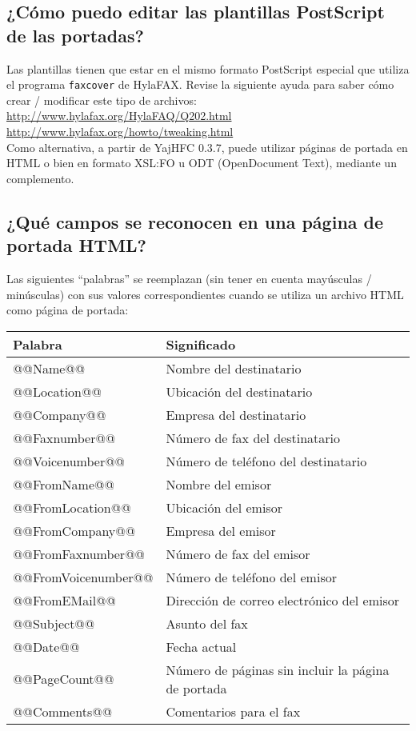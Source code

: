 \documentclass[a4paper,10pt]{scrartcl}
\begin{document}
\subsection{¿Cómo puedo editar las plantillas PostScript de las portadas?}
Las plantillas tienen que estar en el mismo formato PostScript especial 
que utiliza el programa \texttt{faxcover} de HylaFAX. Revise la siguiente ayuda 
para saber cómo crear / modificar este tipo de archivos: \\
\url{http://www.hylafax.org/HylaFAQ/Q202.html}\\
\url{http://www.hylafax.org/howto/tweaking.html}\\

Como alternativa, a partir de YajHFC 0.3.7, puede utilizar páginas de portada en HTML o bien en formato XSL:FO u ODT (OpenDocument Text), mediante un complemento.

\subsection{¿Qué campos se reconocen en una página de portada HTML?}

Las siguientes ``palabras'' se reemplazan (sin tener en cuenta mayúsculas / minúsculas) con sus valores correspondientes cuando se utiliza un archivo HTML como página de portada:

\begin{center}
\begin{tabular}{|l|l|}
\hline
\bfseries Palabra & \bfseries Significado \\
\hline\hline
\ttfamily @@Name@@ & Nombre del destinatario \\\hline
\ttfamily @@Location@@ & Ubicación del destinatario \\\hline
\ttfamily @@Company@@ & Empresa del destinatario \\\hline
\ttfamily @@Faxnumber@@ & Número de fax del destinatario \\\hline
\ttfamily @@Voicenumber@@ & Número de teléfono del destinatario \\\hline
\ttfamily @@FromName@@ & Nombre del emisor \\\hline
\ttfamily @@FromLocation@@ & Ubicación del emisor \\\hline
\ttfamily @@FromCompany@@ & Empresa del emisor \\\hline
\ttfamily @@FromFaxnumber@@ & Número de fax del emisor \\\hline
\ttfamily @@FromVoicenumber@@ & Número de teléfono del emisor \\\hline
\ttfamily @@FromEMail@@ & Dirección de correo electrónico del emisor \\\hline
\ttfamily @@Subject@@ & Asunto del fax \\\hline
\ttfamily @@Date@@ & Fecha actual \\\hline
\ttfamily @@PageCount@@ & Número de páginas sin incluir la página de portada \\\hline
\ttfamily @@Comments@@ & Comentarios para el fax \\\hline
\end{tabular}
\end{center}
\end{document}
